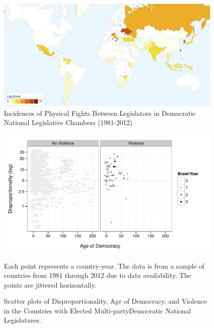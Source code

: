 \documentclass[a4paper]{article}\usepackage[]{graphicx}\usepackage[]{color}
\newenvironment{knitrout}{}{} %
\begin{document}
\clearpage

\begin{figure}[h!]
    \centering

        \includegraphics[width = 13cm]{incidence_map.png}

        \caption{Incidences of Physical Fights Between Legislators in Democratic National Legislative Chambers (1981-2012)}
        \label{leg_map}

\end{figure}

\begin{figure}[t]
    \begin{center}

\begin{knitrout}
\color{fgcolor}
\includegraphics[width=0.8\linewidth]{figure/FrameworkEmpirical-1} 

\end{knitrout}
    \end{center}

    \caption{Scatter plots of Disproportionality, Age of Democracy, and Violence in the Countries with {Elected Multi-party}{Democratic} National Legislatures.}
    \label{framework_empirical}

    \begin{singlespace}
        {\scriptsize{Each point represents a country-year. The data is from a sample of countries from 1981 through 2012 due to data availability. The points are jittered horizontally.}}
    \end{singlespace}

\end{figure}
\end{document}
